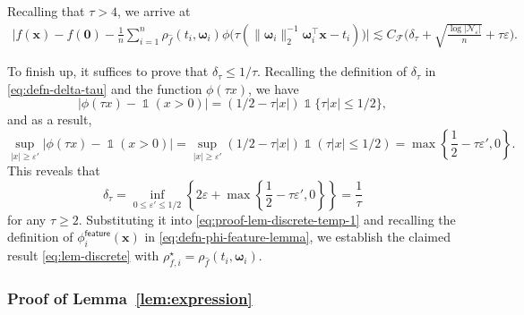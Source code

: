 \documentclass[english]{article}
\DeclareMathOperator{\ind}{\mathds{1}}  %
\begin{document}
Recalling that $\tau>4$, we arrive at
%
\begin{align}\label{eq:proof-lem-discrete-temp-1}
\bigg|f({\bm x}) - f(\bm{0}) -  \frac{1}{n}\sum_{i = 1}^n\rho_{\widehat{f}}(t_i, \bm{\omega}_i)\phi\big(\tau(\|\bm{\omega}_i\|_2^{-1}\bm{\omega}_i^{\top}{\bm x} - t_i)\big)\bigg|\lesssim C_{\mathcal{F}}\Big(\delta_{\tau} + \sqrt{\frac{\log|\mathcal{N}_{\varepsilon}|}{n}} + \tau\varepsilon\Big).
\end{align}

To finish up, it suffices to prove that $\delta_\tau\le 1/\tau$.
Recalling the definition of $\delta_\tau$ in \eqref{eq:defn-delta-tau} and the function $\phi(\tau x)$, we have $$|\phi(\tau x) - \ind(x>0)| = (1/2-\tau|x|)\ind\{\tau|x|\le 1/2\},$$ and as a result, 
$$
\sup_{|x|\ge \varepsilon'} \big|\phi(\tau x) - \ind(x>0) \big| = \sup_{|x|\ge \varepsilon'}(1/2-\tau|x|)\ind(\tau|x|\le 1/2) = \max\left\{\frac12 - \tau\varepsilon',0\right\}. 
$$
This reveals that
$$
\delta_\tau = \inf_{0\le \varepsilon'\le 1/2}\left\{2\varepsilon + \max\left\{\frac12 - \tau\varepsilon',0\right\}\right\}= \frac{1}{\tau} 
$$
for any $\tau \ge 2$.
Substituting it into \eqref{eq:proof-lem-discrete-temp-1} and recalling the definition of $\phi_i^{\mathsf{feature}}({\bm x})$ in \eqref{eq:defn-phi-feature-lemma}, we establish the claimed result \eqref{eq:lem-discrete} with $\rho_{f,i}^{\star} = \rho_{\widehat{f}}(t_i,{\bm \omega}_i)$.

\subsubsection{Proof of Lemma~\ref{lem:expression}}
\label{sec:proof:lem:expression}
\end{document}
